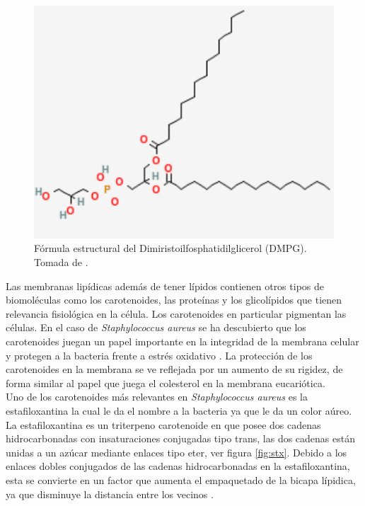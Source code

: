 \documentclass[12pt]{article}
\begin{document}
\begin{figure}[h]
\begin{center}
    \includegraphics[scale=0.4]{DMPG.pdf}
  \caption{Fórmula estructural del Dimiristoilfosphatidilglicerol (DMPG). Tomada de \cite{CHEMDRUGDMPGDimyristoylphosphatidylglycerol}.}
  \label{fig:DMPG}
\end{center}
\end{figure}
Las membranas lipídicas además de tener lípidos contienen otros tipos de biomoléculas como los carotenoides, las proteínas y los glicolípidos que tienen relevancia fisiológica en la célula. Los carotenoides en particular pigmentan las células. En el caso de \textit{Staphylococcus aureus} se ha descubierto que los carotenoides juegan un papel importante en la integridad de la membrana celular y protegen a la bacteria frente a estrés oxidativo \cite{Nagendra2011}. La protección de los carotenoides en la membrana se ve reflejada por un aumento de su rigidez, de forma similar al papel que juega el colesterol en la membrana eucariótica. \\

Uno de los carotenoides más relevantes en \textit{Staphylococcus aureus} es la estafiloxantina la cual le da el nombre a la bacteria ya que le da un color aúreo. La estafiloxantina es un  triterpeno carotenoide en que posee dos cadenas hidrocarbonadas con insaturaciones conjugadas tipo trans, las dos cadenas están unidas a un azúcar mediante enlaces tipo eter, ver figura \ref{fig:stx}. Debido a los enlaces dobles conjugados de las cadenas hidrocarbonadas en la estafiloxantina, esta se convierte en un factor que aumenta el empaquetado de la bicapa lípidica, ya que disminuye la distancia entre los vecinos \cite{Heimburg}.\\
\end{document}
